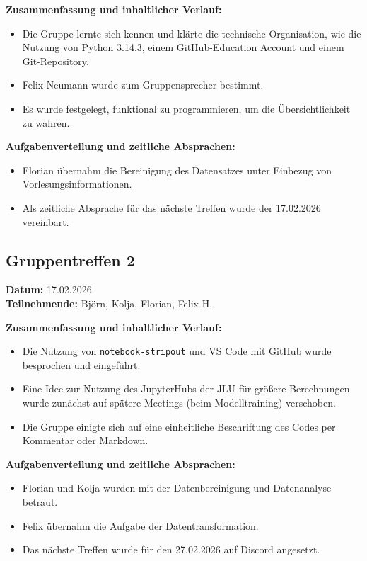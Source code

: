 \documentclass[9pt,a4paper,twocolumn,twoside]{tau-class/tau}
\begin{document}
\textbf{Zusammenfassung und inhaltlicher Verlauf:}
\begin{itemize}
    \item Die Gruppe lernte sich kennen und klärte die technische Organisation, wie die Nutzung von Python 3.14.3, einem GitHub-Education Account und einem Git-Repository.
    \item Felix Neumann wurde zum Gruppensprecher bestimmt.
    \item Es wurde festgelegt, funktional zu programmieren, um die Übersichtlichkeit zu wahren.
\end{itemize}

\textbf{Aufgabenverteilung und zeitliche Absprachen:}
\begin{itemize}
    \item Florian übernahm die Bereinigung des Datensatzes unter Einbezug von Vorlesungsinformationen.
    \item Als zeitliche Absprache für das nächste Treffen wurde der 17.02.2026 vereinbart.
\end{itemize}

\subsection*{Gruppentreffen 2}
\textbf{Datum:} 17.02.2026 \\
\textbf{Teilnehmende:} Björn, Kolja, Florian, Felix H.

\textbf{Zusammenfassung und inhaltlicher Verlauf:}
\begin{itemize}
    \item Die Nutzung von \texttt{notebook-stripout} und VS Code mit GitHub wurde besprochen und eingeführt.
    \item Eine Idee zur Nutzung des JupyterHubs der JLU für größere Berechnungen wurde zunächst auf spätere Meetings (beim Modelltraining) verschoben.
    \item Die Gruppe einigte sich auf eine einheitliche Beschriftung des Codes per Kommentar oder Markdown.
\end{itemize}

\textbf{Aufgabenverteilung und zeitliche Absprachen:}
\begin{itemize}
    \item Florian und Kolja wurden mit der Datenbereinigung und Datenanalyse betraut.
    \item Felix übernahm die Aufgabe der Datentransformation.
    \item Das nächste Treffen wurde für den 27.02.2026 auf Discord angesetzt.
\end{itemize}
\end{document}

